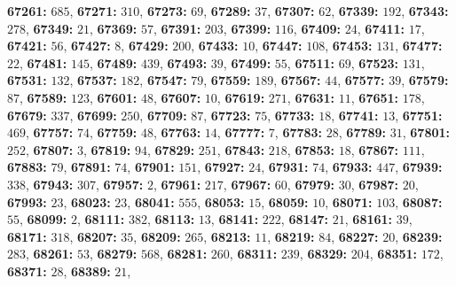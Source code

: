 \textsf{\bfseries 67261:} $685$, \textsf{\bfseries 67271:} $310$, \textsf{\bfseries 67273:} $69$, \textsf{\bfseries 67289:} $37$, \textsf{\bfseries 67307:} $62$, \textsf{\bfseries 67339:} $192$, \textsf{\bfseries 67343:} $278$, \textsf{\bfseries 67349:} $21$, \textsf{\bfseries 67369:} $57$, \textsf{\bfseries 67391:} $203$, \textsf{\bfseries 67399:} $116$, \textsf{\bfseries 67409:} $24$, \textsf{\bfseries 67411:} $17$, \textsf{\bfseries 67421:} $56$, \textsf{\bfseries 67427:} $8$, \textsf{\bfseries 67429:} $200$, \textsf{\bfseries 67433:} $10$, \textsf{\bfseries 67447:} $108$, \textsf{\bfseries 67453:} $131$, \textsf{\bfseries 67477:} $22$, \textsf{\bfseries 67481:} $145$, \textsf{\bfseries 67489:} $439$, \textsf{\bfseries 67493:} $39$, \textsf{\bfseries 67499:} $55$, \textsf{\bfseries 67511:} $69$, \textsf{\bfseries 67523:} $131$, \textsf{\bfseries 67531:} $132$, \textsf{\bfseries 67537:} $182$, \textsf{\bfseries 67547:} $79$, \textsf{\bfseries 67559:} $189$, \textsf{\bfseries 67567:} $44$, \textsf{\bfseries 67577:} $39$, \textsf{\bfseries 67579:} $87$, \textsf{\bfseries 67589:} $123$, \textsf{\bfseries 67601:} $48$, \textsf{\bfseries 67607:} $10$, \textsf{\bfseries 67619:} $271$, \textsf{\bfseries 67631:} $11$, \textsf{\bfseries 67651:} $178$, \textsf{\bfseries 67679:} $337$, \textsf{\bfseries 67699:} $250$, \textsf{\bfseries 67709:} $87$, \textsf{\bfseries 67723:} $75$, \textsf{\bfseries 67733:} $18$, \textsf{\bfseries 67741:} $13$, \textsf{\bfseries 67751:} $469$, \textsf{\bfseries 67757:} $74$, \textsf{\bfseries 67759:} $48$, \textsf{\bfseries 67763:} $14$, \textsf{\bfseries 67777:} $7$, \textsf{\bfseries 67783:} $28$, \textsf{\bfseries 67789:} $31$, \textsf{\bfseries 67801:} $252$, \textsf{\bfseries 67807:} $3$, \textsf{\bfseries 67819:} $94$, \textsf{\bfseries 67829:} $251$, \textsf{\bfseries 67843:} $218$, \textsf{\bfseries 67853:} $18$, \textsf{\bfseries 67867:} $111$, \textsf{\bfseries 67883:} $79$, \textsf{\bfseries 67891:} $74$, \textsf{\bfseries 67901:} $151$, \textsf{\bfseries 67927:} $24$, \textsf{\bfseries 67931:} $74$, \textsf{\bfseries 67933:} $447$, \textsf{\bfseries 67939:} $338$, \textsf{\bfseries 67943:} $307$, \textsf{\bfseries 67957:} $2$, \textsf{\bfseries 67961:} $217$, \textsf{\bfseries 67967:} $60$, \textsf{\bfseries 67979:} $30$, \textsf{\bfseries 67987:} $20$, \textsf{\bfseries 67993:} $23$, \textsf{\bfseries 68023:} $23$, \textsf{\bfseries 68041:} $555$, \textsf{\bfseries 68053:} $15$, \textsf{\bfseries 68059:} $10$, \textsf{\bfseries 68071:} $103$, \textsf{\bfseries 68087:} $55$, \textsf{\bfseries 68099:} $2$, \textsf{\bfseries 68111:} $382$, \textsf{\bfseries 68113:} $13$, \textsf{\bfseries 68141:} $222$, \textsf{\bfseries 68147:} $21$, \textsf{\bfseries 68161:} $39$, \textsf{\bfseries 68171:} $318$, \textsf{\bfseries 68207:} $35$, \textsf{\bfseries 68209:} $265$, \textsf{\bfseries 68213:} $11$, \textsf{\bfseries 68219:} $84$, \textsf{\bfseries 68227:} $20$, \textsf{\bfseries 68239:} $283$, \textsf{\bfseries 68261:} $53$, \textsf{\bfseries 68279:} $568$, \textsf{\bfseries 68281:} $260$, \textsf{\bfseries 68311:} $239$, \textsf{\bfseries 68329:} $204$, \textsf{\bfseries 68351:} $172$, \textsf{\bfseries 68371:} $28$, \textsf{\bfseries 68389:} $21$, 

